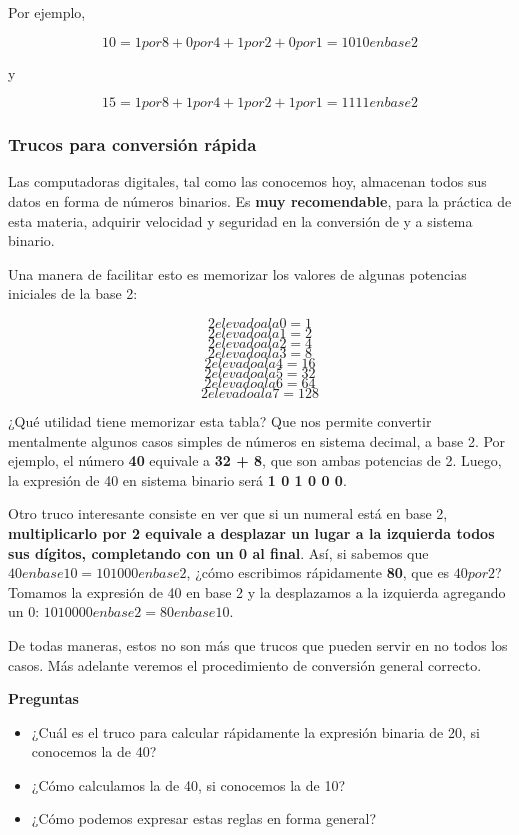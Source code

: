 \documentclass[spanish,A4,]{article}
\begin{document}
Por ejemplo,

\[10 = 1 por 8 + 0 por 4 + 1 por 2 + 0 por 1 = 1 0 1 0 en base 2\]

y

\[15 = 1 por 8 + 1 por 4 + 1 por 2 + 1 por 1 = 1 1 1 1 en base 2\]

\subsubsection{Trucos para conversión
rápida}\label{trucos-para-conversiuxf3n-ruxe1pida}

Las computadoras digitales, tal como las conocemos hoy, almacenan todos
sus datos en forma de números binarios. Es \textbf{muy recomendable},
para la práctica de esta materia, adquirir velocidad y seguridad en la
conversión de y a sistema binario.

Una manera de facilitar esto es memorizar los valores de algunas
potencias iniciales de la base 2:

\[2 elevado a la 0 = 1\] \[2 elevado a la 1 = 2\] \[2 elevado a la 2 = 4\] \[2 elevado a la 3 = 8\] \[2 elevado a la 4 = 16\]
\[2 elevado a la 5 = 32\] \[2 elevado a la 6 = 64\] \[2 elevado a la 7 = 128\]

¿Qué utilidad tiene memorizar esta tabla? Que nos permite convertir
mentalmente algunos casos simples de números en sistema decimal, a base
2. Por ejemplo, el número \textbf{40} equivale a \textbf{32 + 8}, que
son ambas potencias de 2. Luego, la expresión de 40 en sistema binario
será \textbf{1 0 1 0 0 0}.

Otro truco interesante consiste en ver que si un numeral está en base 2,
\textbf{multiplicarlo por 2 equivale a desplazar un lugar a la izquierda
todos sus dígitos, completando con un 0 al final}. Así, si sabemos que
$40 en base 10 = 1 0 1 0 0 0 en base 2$, ¿cómo escribimos rápidamente \textbf{80}, que
es $40 por 2$? Tomamos la expresión de 40 en base 2 y la desplazamos a
la izquierda agregando un 0: $1 0 1 0 0 0 0 en base 2 = 80 en base 10$.

De todas maneras, estos no son más que trucos que pueden servir en no
todos los casos. Más adelante veremos el procedimiento de conversión
general correcto.

\textbf{Preguntas}

\begin{itemize}
\itemsep1pt\parskip0pt
\item
  ¿Cuál es el truco para calcular rápidamente la expresión binaria de
  20, si conocemos la de 40?
\item
  ¿Cómo calculamos la de 40, si conocemos la de 10?
\item
  ¿Cómo podemos expresar estas reglas en forma general?
\end{itemize}
\end{document}

